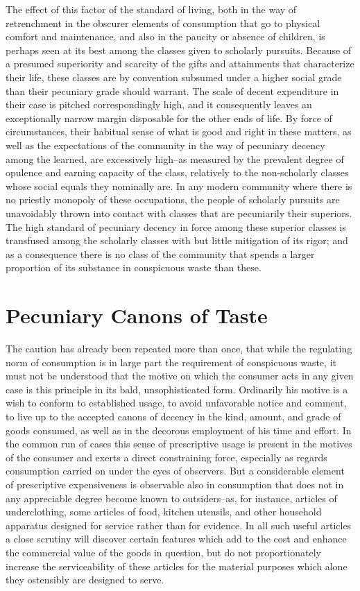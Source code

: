 \documentclass[12pt]{report}
\begin{document}
The effect of this factor of the standard of living, both in the way of
retrenchment in the obscurer elements of consumption that go to physical
comfort and maintenance, and also in the paucity or absence of children,
is perhaps seen at its best among the classes given to scholarly
pursuits. Because of a presumed superiority and scarcity of the gifts
and attainments that characterize their life, these classes are by
convention subsumed under a higher social grade than their pecuniary
grade should warrant. The scale of decent expenditure in their case
is pitched correspondingly high, and it consequently leaves an
exceptionally narrow margin disposable for the other ends of life. By
force of circumstances, their habitual sense of what is good and right
in these matters, as well as the expectations of the community in the
way of pecuniary decency among the learned, are excessively high--as
measured by the prevalent degree of opulence and earning capacity of the
class, relatively to the non-scholarly classes whose social equals
they nominally are. In any modern community where there is no priestly
monopoly of these occupations, the people of scholarly pursuits are
unavoidably thrown into contact with classes that are pecuniarily their
superiors. The high standard of pecuniary decency in force among these
superior classes is transfused among the scholarly classes with but
little mitigation of its rigor; and as a consequence there is no class
of the community that spends a larger proportion of its substance in
conspicuous waste than these.




\chapter{Pecuniary Canons of Taste}
The caution has already been repeated more than once, that while the
regulating norm of consumption is in large part the requirement of
conspicuous waste, it must not be understood that the motive on which
the consumer acts in any given case is this principle in its bald,
unsophisticated form. Ordinarily his motive is a wish to conform to
established usage, to avoid unfavorable notice and comment, to live
up to the accepted canons of decency in the kind, amount, and grade of
goods consumed, as well as in the decorous employment of his time and
effort. In the common run of cases this sense of prescriptive usage is
present in the motives of the consumer and exerts a direct constraining
force, especially as regards consumption carried on under the eyes of
observers. But a considerable element of prescriptive expensiveness is
observable also in consumption that does not in any appreciable degree
become known to outsiders--as, for instance, articles of underclothing,
some articles of food, kitchen utensils, and other household apparatus
designed for service rather than for evidence. In all such useful
articles a close scrutiny will discover certain features which add to
the cost and enhance the commercial value of the goods in question, but
do not proportionately increase the serviceability of these articles for
the material purposes which alone they ostensibly are designed to serve.
\end{document}
